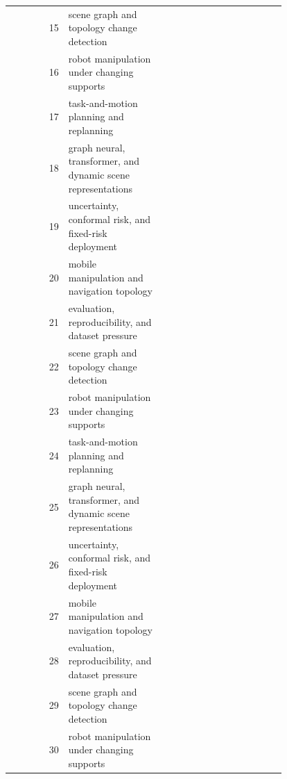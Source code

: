 \documentclass{article}
\begin{document}
\begin{longtable}{r p{0.34\linewidth} p{0.45\linewidth}}
15 & scene graph and topology change detection & \citep{lin2013holistic43,yew2021cityscale44,park2012adaptive45} \\
16 & robot manipulation under changing supports & \citep{kannan2025zeroscd46,wan2025uncertainty47,niu2024druformer48} \\
17 & task-and-motion planning and replanning & \citep{oeljeklaus2021an49,strader2025languagegrounded50,vieira2014spatial51} \\
18 & graph neural, transformer, and dynamic scene representations & \citep{sofman2011anytime52,shi2024fastpcanet53,stinner2019takeshi54} \\
19 & uncertainty, conformal risk, and fixed-risk deployment & \citep{brust2015convolutional55,wang2025timeintervalguided56,kim2021graph57} \\
20 & mobile manipulation and navigation topology & \citep{dias2025movingcamera58,sarantopoulos2025robust59,mujilitu2025joining60} \\
21 & evaluation, reproducibility, and dataset pressure & \citep{won2025advancement61,sohn2025potenziale62,engelbracht2025spotlight63} \\
22 & scene graph and topology change detection & \citep{magdy2025dynamic64,leoputra2010a65,yue2020improved66} \\
23 & robot manipulation under changing supports & \citep{gu2025artisg67,chan2019deep68,bao2010toward69} \\
24 & task-and-motion planning and replanning & \citep{yun2013exploring70,schneider2017collision71,curto2023semantic72} \\
25 & graph neural, transformer, and dynamic scene representations & \citep{wang2026dynamic73,jansen2023visualizing74,zhang2024visionlanguage75} \\
26 & uncertainty, conformal risk, and fixed-risk deployment & \citep{bao2011toward76,cadena2015a77,haltakov2012scene78} \\
27 & mobile manipulation and navigation topology & \citep{farsoni2022planning79,rich2000failure80,yan2024dynamic81} \\
28 & evaluation, reproducibility, and dataset pressure & \citep{yang2022jdsnet82,xia2019leveraging83,ng2019effective84} \\
29 & scene graph and topology change detection & \citep{sandino2021dronebased85,li2016deep86,zhang2025enhancing87} \\
30 & robot manipulation under changing supports & \citep{guo2023research88,guo2021a89,touati2020anomaly90} \\

\end{longtable}
\end{document}
